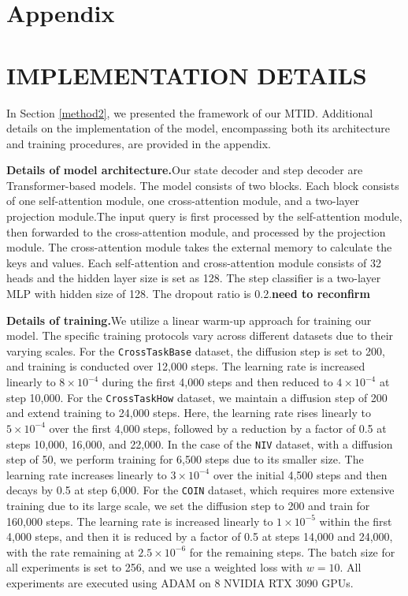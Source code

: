 \section*{Appendix}
\appendix
\section{IMPLEMENTATION DETAILS}
In Section \ref{method2}, we presented the framework of our MTID. Additional details on the implementation of the model, encompassing both its architecture and training procedures, are provided in the appendix.

\textbf{Details of model architecture.}Our state decoder and step decoder are Transformer-based models. The model consists of two blocks. Each block consists of one
self-attention module, one cross-attention module, and a two-layer projection module.The input
query is first processed by the self-attention module, then forwarded to the cross-attention module,
and processed by the projection module. The cross-attention module takes the external memory to
calculate the keys and values. Each self-attention and cross-attention module consists of 32 heads
and the hidden layer size is set as 128. The step classifier is a two-layer MLP with hidden size of 128.
The dropout ratio is 0.2.\textbf{need to reconfirm}

\textbf{Details of training.}We utilize a linear warm-up approach for training our model. The specific training protocols vary across different datasets due to their varying scales. For the \texttt{CrossTaskBase} dataset, the diffusion step is set to 200, and training is conducted over 12,000 steps. The learning rate is increased linearly to \(8 \times 10^{-4}\) during the first 4,000 steps and then reduced to \(4 \times 10^{-4}\) at step 10,000. For the \texttt{CrossTaskHow} dataset, we maintain a diffusion step of 200 and extend training to 24,000 steps. Here, the learning rate rises linearly to \(5 \times 10^{-4}\) over the first 4,000 steps, followed by a reduction by a factor of 0.5 at steps 10,000, 16,000, and 22,000. In the case of the \texttt{NIV} dataset, with a diffusion step of 50, we perform training for 6,500 steps due to its smaller size. The learning rate increases linearly to \(3 \times 10^{-4}\) over the initial 4,500 steps and then decays by 0.5 at step 6,000. For the \texttt{COIN} dataset, which requires more extensive training due to its large scale, we set the diffusion step to 200 and train for 160,000 steps. The learning rate is increased linearly to \(1 \times 10^{-5}\) within the first 4,000 steps, and then it is reduced by a factor of 0.5 at steps 14,000 and 24,000, with the rate remaining at \(2.5 \times 10^{-6}\) for the remaining steps. The batch size for all experiments is set to 256, and we use a weighted loss with \(w = 10\). All experiments are executed using ADAM \cite{23} on 8 NVIDIA RTX 3090 GPUs.

